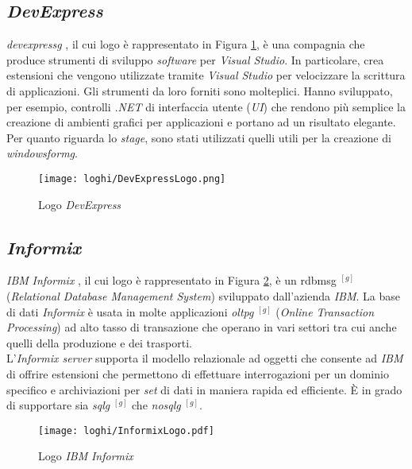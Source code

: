 \subsection*{\textit{DevExpress}}
\noindent \textit{\gls{devexpressg}} \cite{siteJ:devexpress-docs}, il cui logo è rappresentato in Figura \ref{logoDevExpress}, è una compagnia che produce strumenti di sviluppo \textit{software} per
\textit{Visual Studio}. In particolare, crea estensioni che vengono utilizzate tramite \textit{Visual Studio}
per velocizzare la scrittura di applicazioni. Gli strumenti da loro forniti sono
molteplici. Hanno sviluppato, per esempio, controlli \textit{.NET} di interfaccia utente (\textit{UI}) che
rendono più semplice la creazione di ambienti grafici per applicazioni e portano ad un risultato
elegante. Per quanto riguarda lo \textit{stage}, sono stati utilizzati quelli utili per la creazione di \textit{\gls{windowsformg}}.
\begin{figure}[!h] 
    \centering 
    \texttt{[image: loghi/DevExpressLogo.png]}
    \caption{Logo \textit{DevExpress}}
    \label{logoDevExpress}
\end{figure}

\subsection*{\textit{Informix}}
\noindent \textit{IBM} \textit{Informix} \cite{siteL:informix-docs}, il cui logo è rappresentato in Figura \ref{logoInformix}, è un \gls{rdbmsg} $^{[g]}$ (\textit{Relational Database Management System}) sviluppato dall'azienda \textit{IBM}. La base di dati \textit{Informix} è usata in molte
applicazioni \textit{\gls{oltpg}} $^{[g]}$ (\textit{Online Transaction Processing}) ad alto tasso di transazione che operano in vari settori tra cui anche quelli della produzione e dei trasporti.\\
L’\textit{Informix server} supporta il modello relazionale ad oggetti che consente ad \textit{IBM} di
offrire estensioni che permettono di effettuare interrogazioni per un dominio specifico
e archiviazioni per \textit{set} di dati in maniera rapida ed efficiente.
È in grado di supportare sia \textit{\gls{sqlg}} $^{[g]}$ che \textit{\gls{nosqlg}} $^{[g]}$.
\begin{figure}[!h] 
    \centering 
    \texttt{[image: loghi/InformixLogo.pdf]}
    \caption{Logo \textit{IBM} \textit{Informix}}
    \label{logoInformix}
\end{figure}

